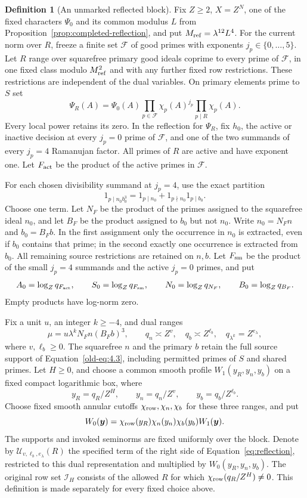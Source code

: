 \documentclass[11pt,a4paper]{article}
\numberwithin{equation}{section}
\numberwithin{figure}{section}
\theoremstyle{definition}
\newtheorem{definition}[theorem]{Definition}
\theoremstyle{remark}
\begin{document}
\begin{definition}[An unmarked reflected block]
\label{def:unmarked-reflected-block}
Fix $Z\ge2$, $X=Z^N$, one of the fixed characters $\Psi_0$ and its common
modulus $L$ from Proposition~\ref{prop:completed-reflection}, and put
$M_{\rm ref}=\lambda^{12}L^4$.  For the current norm over $R$, freeze a finite set $\mathcal F$ of
good primes with exponents $j_p\in\{0,\ldots,5\}$.  Let $R$ range over
squarefree primary good ideals coprime to every prime of $\mathcal F$, in
one fixed class modulo $M_{\rm ref}^2$ and with any further fixed row
restrictions.  These restrictions are independent of the dual variables.
On primary elements prime to $S$ set
\[
 \Psi_R(A)=\Psi_0(A)\prod_{p\in\mathcal F}\chi_p(A)^{j_p}
                         \prod_{p\mid R}\chi_p(A).
\]
Every local power retains its zero.  In the reflection for $\Psi_R$, fix
$h_0$, the active or inactive decision at every $j_p=0$ prime of
$\mathcal F$, and one of the two summands of every $j_p=4$ Ramanujan factor.
All primes of $R$ are active and have exponent one.  Let $F_{\rm act}$ be
the product of the active primes in $\mathcal F$.

For each chosen divisibility summand at $j_p=4$, use the exact partition
\[
 1_{p\mid n_0b_0^3}=1_{p\mid n_0}+1_{p\nmid n_0}1_{p\mid b_0}.
\]
Choose one term.  Let $N_F$ be the product of the primes assigned to the
squarefree ideal $n_0$, and let $B_F$ be the product assigned to $b_0$ but
not $n_0$.  Write $n_0=N_Fn$ and $b_0=B_Fb$.  In the first assignment only
the occurrence in $n_0$ is extracted, even if $b_0$ contains that prime;
in the second exactly one occurrence is extracted from $b_0$.  All remaining
source restrictions are retained on $n,b$.  Let $F_{\rm sm}$ be the product
of the small $j_p=4$ summands and the active $j_p=0$ primes, and put
\[
 A_0=\log_Zq_{F_{\rm act}},\qquad S_0=\log_Zq_{F_{\rm sm}},\qquad
 N_0=\log_Zq_{N_F},\qquad B_0=\log_Zq_{B_F}.
\]
Empty products have log-norm zero.

Fix a unit $u$, an integer $k\ge-4$, and dual ranges
\[
 \mu=u\lambda^kN_Fn(B_Fb)^3,\qquad
 q_n\asymp Z^v,\quad q_b\asymp Z^{\ell_b},\quad
 q_{\lambda^k}=Z^{e_\lambda},
\]
where $v,\ell_b\ge0$.  The squarefree $n$ and the primary $b$ retain the
full source support of Equation~\eqref{old-eq:4.3}, including permitted
primes of $S$ and shared primes.  Let $H\ge0$, and choose a common smooth
profile $W_1(y_R,y_n,y_b)$ on a fixed compact logarithmic box, where
\[
 y_R=q_R/Z^H,\qquad y_n=q_n/Z^v,\qquad y_b=q_b/Z^{\ell_b}.
\]
Choose fixed smooth annular cutoffs $\chi_{\rm row},\chi_n,\chi_b$ for these
three ranges, and put
\[
 W_0(\boldsymbol y)=\chi_{\rm row}(y_R)\chi_n(y_n)\chi_b(y_b)W_1(\boldsymbol y).
\]
The supports and invoked seminorms are fixed uniformly over the block.
Denote by $\mathcal U_{v,\ell_b,e_\lambda}(R)$ the specified
term of the right side of Equation~\eqref{eq:reflection}, restricted to this
dual representation and multiplied by $W_0(y_R,y_n,y_b)$.  The original row
set $\mathcal I_H$ consists of the allowed $R$ for which
$\chi_{\rm row}(q_R/Z^H)\ne0$.  This definition is made separately for
every fixed choice above.
\end{definition}
\end{document}
